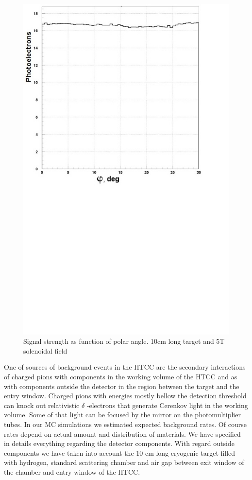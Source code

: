 \begin{figure}[!ht]
    \centering
    \includegraphics[width=1.0\linewidth,trim={0.0cm 9.4cm 0.0cm 0.0cm},clip]{images/10cm_Targ_5T_Field_Phi.jpg}
    \caption{Signal strength as function of polar angle. 10cm long target and 5T solenoidal field}
    \label{fig:10cm_Targ_5T_Field_Phi}
\end{figure}

\indent One of sources of background events in the HTCC are the secondary interactions of charged pions with components in the working volume of the HTCC and as with components outside the detector in the region between the target and the entry window. Charged pions with energies mostly bellow the detection threshold can knock out relativistic $\delta$ -electrons that generate Cerenkov light in the working volume. Some of that light can be focused by the mirror on the photomultiplier tubes. In our MC simulations we estimated expected background rates. Of course rates depend on actual amount and distribution of materials. We have specified in details  everything regarding the detector components. With regard outside components we have taken into account the 10 cm long cryogenic target filled with hydrogen, standard scattering chamber and air gap between exit window of the chamber and entry window of the HTCC.

